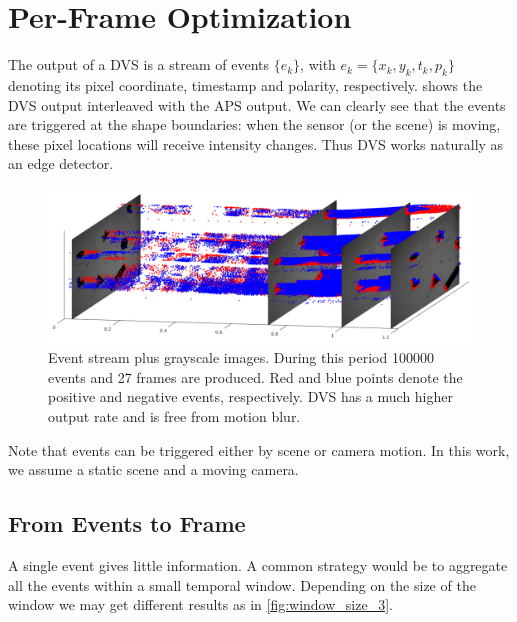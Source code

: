 \chapter{Per-Frame Optimization}
\label{chap:per_frame}
The output of a DVS is a stream of events $\{e_k\}$, with
$e_k=\{x_k,y_k,t_k,p_k\}$ denoting its pixel coordinate, timestamp and
polarity, respectively.  shows the DVS output
interleaved with the APS output. We can clearly see that the events are
triggered at the shape boundaries: when the sensor (or the scene) is
moving, these pixel locations will receive intensity changes. Thus DVS
works naturally as an edge detector.

\begin{figure}[h]
  \centering \includegraphics[width = \textwidth]{images/stream.png}
  \caption{Event stream plus grayscale images. During this period
    \num{100000} events and \num{27} frames are produced. Red and blue
    points denote the positive and negative events, respectively. DVS
    has a much higher output rate and is free from motion blur.}
  \label{fig:stream}
\end{figure}
Note that events can be triggered either by scene or camera motion. In
this work, we assume a static scene and a moving camera.
\section{From Events to Frame}
\label{sec:event_warp}
A single event gives little information. A common strategy would be to
aggregate all the events within a small temporal window. Depending on
the size of the window we may get different results as in
\cref{fig:window_size_3}.


